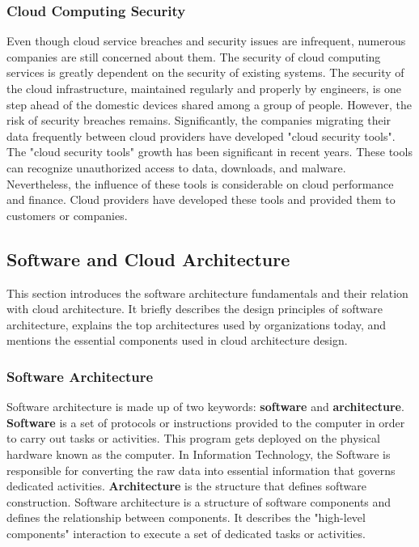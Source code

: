 \documentclass[12pt,a4paper]{article}
\begin{document}
\subsubsection{Cloud Computing Security}

Even though cloud service breaches and security issues are infrequent, numerous companies are still concerned about them. The security of cloud computing services is greatly dependent on the security of existing systems. The security of the cloud infrastructure, maintained regularly and properly by engineers, is one step ahead of the domestic devices shared among a group of people. However, the risk of security breaches remains. Significantly, the companies migrating their data frequently between cloud providers have developed "cloud security tools". The "cloud security tools" growth has been significant in recent years. These tools can recognize unauthorized access to data, downloads, and malware. Nevertheless, the influence of these tools is considerable on cloud performance and finance. Cloud providers have developed these tools and provided them to customers or companies. \cite{r14}

\subsection{Software and Cloud Architecture}

This section introduces the software architecture fundamentals and their relation with cloud architecture. It briefly describes the design principles of software architecture, explains the top architectures used by organizations today, and mentions the essential components used in cloud architecture design.

\subsubsection{Software Architecture}

Software architecture is made up of two keywords: \textbf{software} and \textbf{architecture}. \textbf{Software} is a set of protocols or instructions provided to the computer in order to carry out tasks or activities. This program gets deployed on the physical hardware known as the computer. In Information Technology, the Software is responsible for converting the raw data into essential information that governs dedicated activities. \textbf{Architecture} is the structure that defines software construction. Software architecture is a structure of software components and defines the relationship between components. It describes the "high-level components" interaction to execute a set of dedicated tasks or activities. \cite{r17} \\
\end{document}
